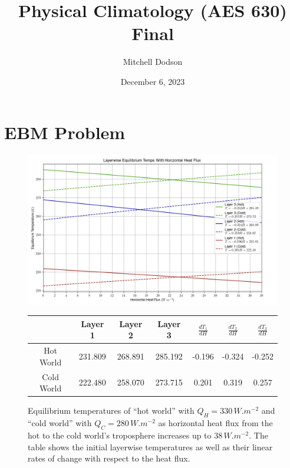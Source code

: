 \documentclass[12pt]{article}
\title{Physical Climatology (AES 630) Final}
\author{Mitchell Dodson}
\date{December 6, 2023}
\newcommand\T{\rule{0pt}{2.6ex}}       %
\newcommand\B{\rule[-1.2ex]{0pt}{0pt}} %
\begin{document}
\vspace{-2em}

\maketitle

\vspace{-2em}

\section{EBM Problem}

\begin{figure}[h!]
    \centering
    \includegraphics[width=.98\linewidth]{q1.png}

    \vspace{1em}

    \begin{tabular}{c | c c c | c c c}
        & Layer 1 & Layer 2 & Layer 3 & $\frac{dT_1}{dH}$ & $\frac{dT_2}{dH}$ & $\frac{dT_3}{dH}$ \B\\
        \hline
        Hot World & 231.809 & 268.891 & 285.192 & -0.196 & -0.324 & -0.252 \T\\
        Cold World & 222.480 & 258.070 & 273.715 & 0.201 & 0.319 & 0.257 \\
    \end{tabular}

    \caption{Equilibrium temperatures of ``hot world'' with $Q_H = 330\,\si{W.m^{-2}}$ and ``cold world'' with $Q_C = 280\,\si{W.m^{-2}}$ as horizontal heat flux from the hot to the cold world's troposphere increases up to $38\,\si{W.m^{-2}}$. The table shows the initial layerwise temperatures as well as their linear rates of change with respect to the heat flux.}
    \label{q1}
\end{figure}
\end{document}
